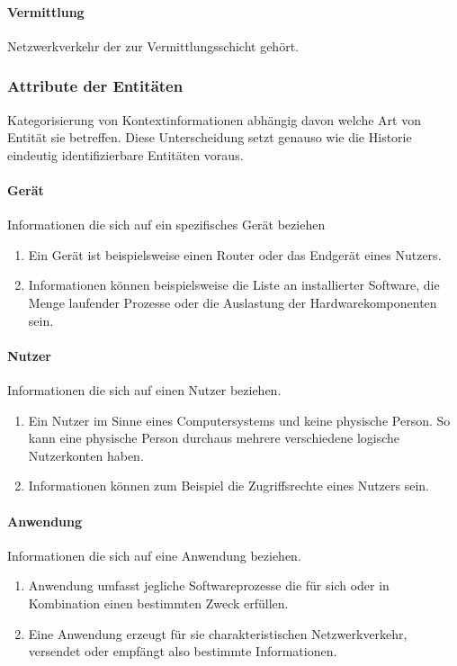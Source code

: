 \paragraph{Vermittlung}
Netzwerkverkehr der zur Vermittlungsschicht gehört.


\subsubsection{Attribute der Entitäten}
Kategorisierung von Kontextinformationen abhängig davon welche Art von Entität sie betreffen.
Diese Unterscheidung setzt genauso wie die Historie eindeutig identifizierbare Entitäten voraus.
\paragraph{Gerät}
Informationen die sich auf ein spezifisches Gerät beziehen
\begin{enumerate}
\item{Ein Gerät ist beispielsweise einen Router oder das Endgerät eines Nutzers. }
\item{Informationen können beispielsweise die Liste an installierter Software, die Menge laufender Prozesse oder die Auslastung der Hardwarekomponenten sein.}
\end{enumerate}
\paragraph{Nutzer}
Informationen die sich auf einen Nutzer beziehen.
\begin{enumerate}
\item{Ein Nutzer im Sinne eines Computersystems und keine physische Person. So kann eine physische Person durchaus mehrere verschiedene logische Nutzerkonten haben. }
\item{Informationen können zum Beispiel die Zugriffsrechte eines Nutzers sein.}
\end{enumerate}
\paragraph{Anwendung}
Informationen die sich auf eine Anwendung beziehen.
\begin{enumerate}
\item{Anwendung umfasst jegliche Softwareprozesse die für sich oder in Kombination einen bestimmten Zweck erfüllen.}
\item{Eine Anwendung erzeugt für sie charakteristischen Netzwerkverkehr, versendet oder empfängt also bestimmte Informationen.}
\end{enumerate}
